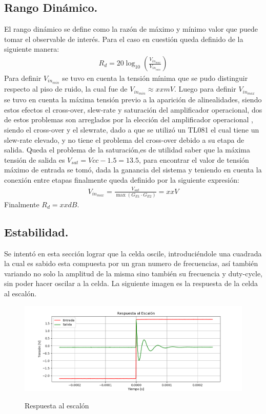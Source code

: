 \subsection{Rango Dinámico.}
El rango dinámico se define como la razón de máximo y mínimo valor que puede tomar el observable de interés. Para el caso en cuestión queda definido de la siguiente manera:
\begin{align}
R_d = 20 \log_{10} \left( \frac{V_{in_{max}}}{V_{in_{min}}} \right)
\end{align}
Para definir $V_{in_{min}}$ se tuvo en cuenta la tensión mínima que se pudo distinguir respecto al piso de ruido, la cual fue de $V_{in_{min}} \approx xxmV$. Luego para definir $V_{in_{max}}$ se tuvo en cuenta la máxima tensión previo a la aparición de alinealidades, siendo estos efectos el cross-over, slew-rate y saturación del amplificador operacional, dos de estos problemas son arreglados por la elección del amplificador operacional , siendo el cross-over y el slewrate, dado a que se utilizó un TL081 el cual tiene un slew-rate elevado, y no tiene el problema del cross-over debido a su etapa de salida. Queda el problema de la saturación,es de utilidad saber que la máxima tensión de salida es $V_{sat} = Vcc-1.5 =13.5$, para encontrar el valor de tensión máximo de entrada se tomó, dada la ganancia del sistema y teniendo en cuenta la conexión entre etapas finalmente queda definido por la siguiente expresión:
\begin{align}
V_{in_{max}}=\frac{V_{sat}}{  \max(G_{E1} \cdot G_{E2} )} = xxV
\end{align}
Finalmente $R_d = xxdB$.
\subsection{Estabilidad.}
Se intentó en esta sección lograr que la celda oscile, introduciéndole una cuadrada la cual es sabido esta compuesta por un gran numero de frecuencias, así también variando no solo la amplitud de la misma sino también su frecuencia y duty-cycle, sin poder hacer oscilar a la celda. La siguiente imagen es la respuesta de la celda al escalón.
\begin{figure}[H]
	\centering
	\includegraphics[width=\textwidth]{Imagenes-Ej3/Step.png}
	\label{fig:stepresponse}
	\caption{Respuesta al escalón}
\end{figure}
